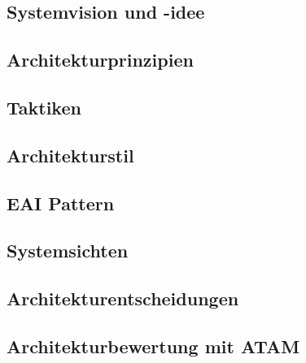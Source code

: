 \subsection{Systemvision und -idee}
\subsection{Architekturprinzipien}
\subsection{Taktiken}
\subsection{Architekturstil}
\subsection{EAI Pattern}
\subsection{Systemsichten}
\subsection{Architekturentscheidungen}
\subsection{Architekturbewertung mit ATAM}
